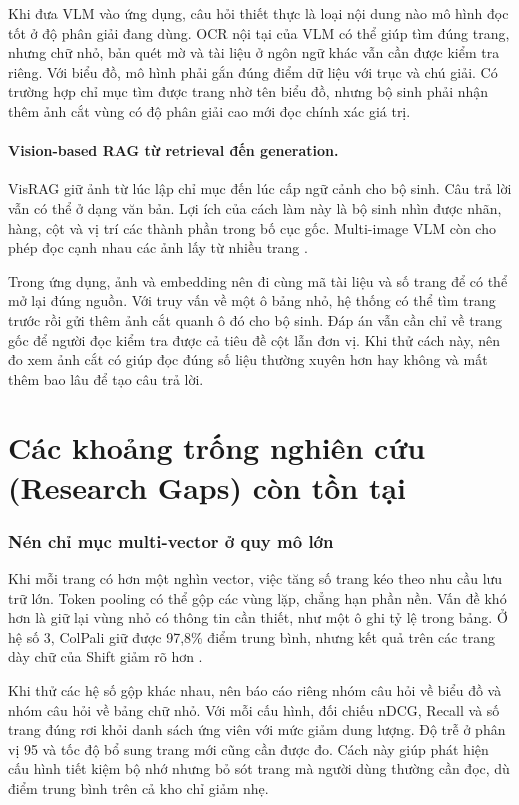 Khi đưa VLM vào ứng dụng, câu hỏi thiết thực là loại nội dung nào mô hình đọc tốt ở độ phân giải đang dùng. OCR nội tại của VLM có thể giúp tìm đúng trang, nhưng chữ nhỏ, bản quét mờ và tài liệu ở ngôn ngữ khác vẫn cần được kiểm tra riêng. Với biểu đồ, mô hình phải gắn đúng điểm dữ liệu với trục và chú giải. Có trường hợp chỉ mục tìm được trang nhờ tên biểu đồ, nhưng bộ sinh phải nhận thêm ảnh cắt vùng có độ phân giải cao mới đọc chính xác giá trị.

\paragraph{Vision-based RAG từ retrieval đến generation.}
VisRAG giữ ảnh từ lúc lập chỉ mục đến lúc cấp ngữ cảnh cho bộ sinh.
Câu trả lời vẫn có thể ở dạng văn bản. Lợi ích của cách làm này là bộ
sinh nhìn được nhãn, hàng, cột và vị trí các thành phần trong bố cục gốc.
Multi-image VLM còn cho phép đọc cạnh nhau các ảnh lấy từ nhiều trang
\cite{yu2025visrag}.

Trong ứng dụng, ảnh và embedding nên đi cùng mã tài liệu và số trang để có thể mở lại đúng nguồn. Với truy vấn về một ô bảng nhỏ, hệ thống có thể tìm trang trước rồi gửi thêm ảnh cắt quanh ô đó cho bộ sinh. Đáp án vẫn cần chỉ về trang gốc để người đọc kiểm tra được cả tiêu đề cột lẫn đơn vị. Khi thử cách này, nên đo xem ảnh cắt có giúp đọc đúng số liệu thường xuyên hơn hay không và mất thêm bao lâu để tạo câu trả lời.

\section{Các khoảng trống nghiên cứu (Research Gaps) còn tồn tại}
\label{sec:conc_gaps}

\subsubsection{Nén chỉ mục multi-vector ở quy mô lớn}

Khi mỗi trang có hơn một nghìn vector, việc tăng số trang kéo theo nhu
cầu lưu trữ lớn. Token pooling có thể gộp các vùng lặp, chẳng hạn phần nền.
Vấn đề khó hơn là giữ lại vùng nhỏ có thông tin cần thiết, như một ô ghi
tỷ lệ trong bảng. Ở hệ số 3, ColPali giữ được 97,8\% điểm trung bình,
nhưng kết quả trên các trang dày chữ của Shift giảm rõ hơn
\cite{faysse2025colpali}.

Khi thử các hệ số gộp khác nhau, nên báo cáo riêng nhóm câu hỏi về biểu
đồ và nhóm câu hỏi về bảng chữ nhỏ. Với mỗi cấu hình, đối chiếu nDCG,
Recall và số trang đúng rơi khỏi danh sách ứng viên với mức giảm dung
lượng. Độ trễ ở phân vị 95 và tốc độ bổ sung trang mới cũng cần được đo.
Cách này giúp phát hiện cấu hình tiết kiệm bộ nhớ nhưng bỏ sót trang mà
người dùng thường cần đọc, dù điểm trung bình trên cả kho chỉ giảm nhẹ.

